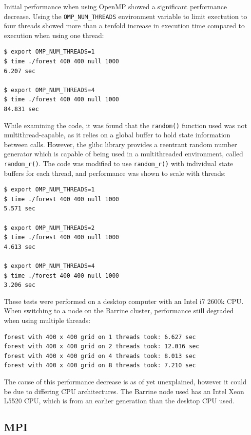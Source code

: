 \documentclass[11pt,a4paper]{report}
\begin{document}
Initial performance when using OpenMP showed a significant performance
decrease. Using the \texttt{OMP\_NUM\_THREADS} environment variable to limit
exectution to four threads showed more than a tenfold increase in execution time compared to
execution when using one thread:

\begin{verbatim}
$ export OMP_NUM_THREADS=1
$ time ./forest 400 400 null 1000
6.207 sec

$ export OMP_NUM_THREADS=4
$ time ./forest 400 400 null 1000
84.831 sec
\end{verbatim}

While examining the code, it was found that the \texttt{random()} function
used was not multithread-capable, as it relies on a global buffer to hold state
information between calls. However, the glibc library provides a reentrant random number
generator which is capable of being used in a multithreaded environment, called
\texttt{random\_r()}. The code was modified to use \texttt{random\_r()} with
individual state buffers for each thread, and performance was shown to scale
with threads:

\begin{verbatim}
$ export OMP_NUM_THREADS=1
$ time ./forest 400 400 null 1000
5.571 sec

$ export OMP_NUM_THREADS=2
$ time ./forest 400 400 null 1000
4.613 sec

$ export OMP_NUM_THREADS=4
$ time ./forest 400 400 null 1000
3.206 sec
\end{verbatim}

These tests were performed on a desktop computer with an Intel i7 2600k CPU.
When switching to a node on the Barrine cluster, performance still degraded
when using multiple threads:

\begin{verbatim}
forest with 400 x 400 grid on 1 threads took: 6.627 sec
forest with 400 x 400 grid on 2 threads took: 12.016 sec
forest with 400 x 400 grid on 4 threads took: 8.013 sec
forest with 400 x 400 grid on 8 threads took: 7.210 sec
\end{verbatim}

The cause of this performance decrease is as of yet unexplained, however it
could be due to differing CPU architectures. The Barrine node used has an Intel
Xeon L5520 CPU, which is from an earlier generation than the desktop CPU used.


\subsection{MPI}
\end{document}

